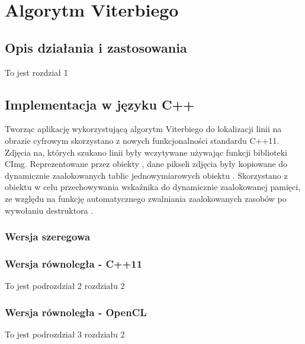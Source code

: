 \documentclass[document.tex]{subfiles}
\begin{document}
\chapter{Algorytm Viterbiego}
\section{Opis działania i zastosowania}
To jest rozdział 1
\section{Implementacja w języku C++}
\indent Tworząc aplikację wykorzystującą algorytm Viterbiego do lokalizacji linii
na obrazie cyfrowym skorzystano z nowych funkcjonalności standardu C++11. 
Zdjęcia na, których szukano linii były wczytywane używając funkcji biblioteki
CImg. Reprezentowane przez obiekty , dane pikseli zdjęcia były kopiowane do
dynamicznie zaalokowanych tablic jednowymiarowych obiektu . Skorzystano z obiektu  w celu przechowywania wskaźnika do dynamicznie zaalokowanej pamięci, ze względu na funkcję automatycznego zwalniania zaalokowanych zasobów po wywołaniu destruktora .  

\subsection{Wersja szeregowa}

 

 


\subsection{Wersja równoległa - C++11}
To jest podrozdział 2 rozdziału 2
\subsection{Wersja równoległa - OpenCL}
To jest podrozdział 3 rozdziału 2
\end{document}
